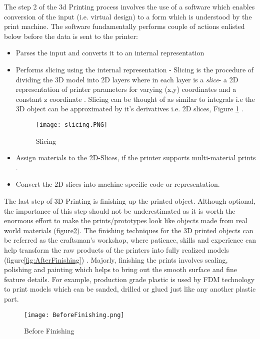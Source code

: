 The step 2 of the 3d Printing process involves the use of a software which enables conversion of the input (i.e. virtual design) to a form which is understood by the print machine. The software fundamentally performs couple of actions enlisted below before the data is sent to the printer:
\begin{itemize}
\item Parses the input and converts it to an internal representation
\item Performs slicing using the internal representation - Slicing is the procedure of dividing the 3D model into 2D layers where in each layer is a \textit{slice}- a 2D representation of printer parameters for varying (x,y) coordinates and a constant z coordinate . Slicing can be thought of as similar to integrals i.e the 3D object can be approximated by it's derivatives i.e. 2D slices, Figure \ref{fig:slic} \cite{slicing}.
\begin{figure}[ht!]
\centering
\texttt{[image: slicing.PNG]}
\caption{Slicing}
\label{fig:slic}
\end{figure}

\item Assign materials to the 2D-Slices, if the printer supports multi-material prints . 
\item Convert the 2D slices into machine specific code or representation.
\end{itemize}

The last step of 3D Printing is finishing up the printed object. Although optional, the importance of this step should not be underestimated as it is worth the enormous effort to make the prints/prototypes look like objects made from real world materials (figure\ref{fig:BeforeFinishing}). The finishing techniques for the 3D printed objects can be referred as the craftsman's workshop, where patience, skills and experience can help transform the raw products of the printers into fully realized models (figure\ref{fig:AfterFinishing}) . Majorly, finishing the prints involves sealing, polishing and painting which helps to bring out the smooth surface and fine feature details. For example, production grade plastic is used by FDM technology to print models which can be sanded, drilled or glued just like any another plastic part. 

\begin{figure}[ht!]
\centering
\texttt{[image: BeforeFinishing.png]}
\caption{Before Finishing}
\label{fig:BeforeFinishing}
\end{figure}

